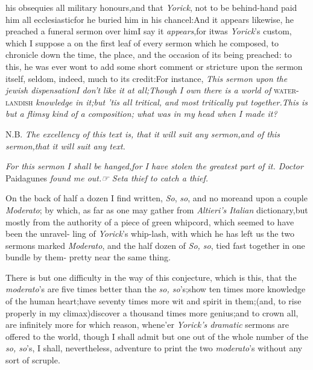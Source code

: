 \documentclass{article}
\begin{document}
\noindent{}
his obsequies all
military honours,\tsk and that \textit{Yorick}, not to be
behind-hand\tsk\break
paid him all ecclesiastic\tsk for he buried him
in his chancel:\tsk And it appears likewise, he preached a
funeral sermon over him\tsh I say it
\textit{appears},\tsk for it\break was \textit{Yorick}’s custom,
which I suppose a  on the
first leaf of every sermon which he composed, to chronicle down the
time, the place, and the occasion of its being preached: to this,
he was ever wont to add some short comment or stricture upon the
sermon itself, seldom, indeed, much to its credit:\tsk For
instance, \textit{This sermon upon the jewish dispensation\tsk I
don’t like it at all;\tsk Though I own there is a world
of} \textsc{water-landish} \textit{knowledge in it;\tsk but
’tis all tritical, and most tritically put
together.\tsk This is but a flimsy kind of a composition; what
was in my head when I made it?}

\tsh N.B. \textit{The excellency of this text is, that it
will suit any sermon,\tsk and of this sermon,\tsh that
it will suit any text.\tsh}

\tsh \textit{For this sermon I shall be
hanged,\break\tsk for I have stolen the greatest part of it. Doctor}
Paidagunes \textit{found me out.\hfill ☞  Set\break a thief to catch a
thief.\tsh}

On the back of half a dozen I find written, \textit{So}, \textit{so}, and no
more\tsh and upon a couple \textit{Moderato}; by which, as
far as one may gather from \textit{Altieri’s Italian}
dictionary,\tsk but mostly from the authority of a piece of green
whipcord, which seemed to have been the unravel- ling of
\textit{Yorick}’s whip-lash, with which he has left us the two
sermons marked \textit{Moderato}, and the half dozen of \textit{So,
so}, tied fast together in one bundle by them-\break
{}\break pretty near the same thing.

There is but one difficulty in the way of this conjecture, which
is this, that the \textit{moderato}’s are five times better
than the \textit{so, so}’s;\tsk show ten times more know\-ledge
of the human heart;\tsk have seventy times more wit and spirit in
them;\tsk (and, to rise properly in my climax)\tsk discover a
thousand times more genius;\break\tsk and to crown all, are infinitely
more 
\break
\tsk for
which reason, whene’er \textit{Yorick’s dramatic} sermons
are offered to the world, though I shall admit but one out of the
whole number of the \textit{so, so}’s, I shall, nevertheless,
adventure to print the two \textit{moderato}’s without any sort
of scruple.
\end{document}
